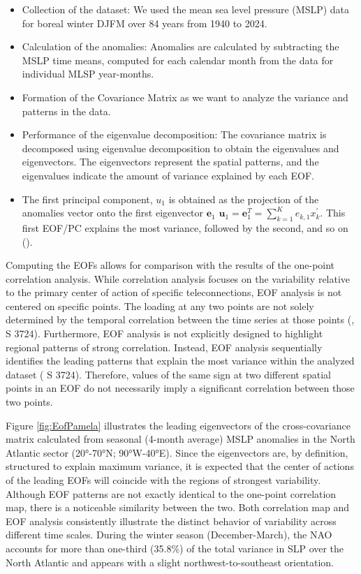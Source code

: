 \documentclass[
]{krantz}
\providecommand{\tightlist}{%
  \setlength{\itemsep}{0pt}\setlength{\parskip}{0pt}}
\begin{document}
\begin{itemize}
\tightlist
\item
  Collection of the dataset: We used the mean sea level pressure (MSLP) data for boreal winter DJFM over 84 years from 1940 to 2024.
\item
  Calculation of the anomalies: Anomalies are calculated by subtracting the MSLP time means, computed for each calendar month from the data for individual MLSP year-months.
\item
  Formation of the Covariance Matrix as we want to analyze the variance and patterns in the data.
\item
  Performance of the eigenvalue decomposition: The covariance matrix is decomposed using eigenvalue decomposition to obtain the eigenvalues and eigenvectors. The eigenvectors represent the spatial patterns, and the eigenvalues indicate the amount of variance explained by each EOF.
\item
  The first principal component, \(u_{1}\) is obtained as the projection of the anomalies vector onto the first eigenvector \(\textbf{e}_{1}\) \(\textbf{u}_{1} = \textbf{e}_{1}^{T} = \sum_{k= 1}^{K} e_{k, 1}x_{k}^{'}\). This first EOF/PC explains the most variance, followed by the second, and so on (\citet{wilks2011}).
\end{itemize}

Computing the EOFs allows for comparison with the results of the one-point correlation analysis. While correlation analysis focuses on the variability relative to the primary center of action of specific teleconnections, EOF analysis is not centered on specific points. The loading at any two points are not solely determined by the temporal correlation between the time series at those points (\citet{athanasiadis2009}, S 3724). Furthermore, EOF analysis is not explicitly designed to highlight regional patterns of strong correlation. Instead, EOF analysis sequentially identifies the leading patterns that explain the most variance within the analyzed dataset (\citet{athanasiadis2009} S 3724). Therefore, values of the same sign at two different spatial points in an EOF do not necessarily imply a significant correlation between those two points.

Figure \ref{fig:EofPamela} illustrates the leading eigenvectors of the cross-covariance matrix calculated from seasonal (4-month average) MSLP anomalies in the North Atlantic sector (20°-70°N; 90°W-40°E). Since the eigenvectors are, by definition, structured to explain maximum variance, it is expected that the center of actions of the leading EOFs will coincide with the regions of strongest variability. Although EOF patterns are not exactly identical to the one-point correlation map, there is a noticeable similarity between the two. Both correlation map and EOF analysis consistently illustrate the distinct behavior of variability across different time scales. During the winter season (December-March), the NAO accounts for more than one-third (35.8\%) of the total variance in SLP over the North Atlantic and appears with a slight northwest-to-southeast orientation.
\end{document}

